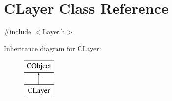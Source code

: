 \hypertarget{classCLayer}{}\section{C\+Layer Class Reference}
\label{classCLayer}


{\ttfamily \#include $<$Layer.\+h$>$}

Inheritance diagram for C\+Layer\+:\begin{figure}[H]
\begin{center}
\leavevmode
\includegraphics[height=2.000000cm]{classCLayer}
\end{center}
\end{figure}

